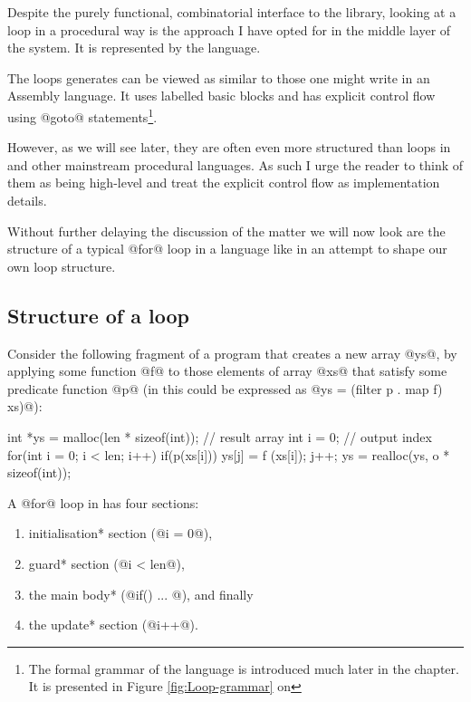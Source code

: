 \documentclass[preamble.tex]{subfiles}
\begin{document}
Despite the purely functional, combinatorial interface to the library, looking at a loop in a procedural way is the approach I have opted for in the middle layer of the system. It is represented by the \Loop language\iloop{}.

The loops \LiveFusion generates can be viewed as similar to those one might write in an Assembly language. It uses labelled basic blocks and has explicit control flow using @goto@ statements\footnote{The formal grammar of the \Loop language is introduced much later in the chapter. It is presented in Figure \ref{fig:Loop-grammar} on \pageref{fig:Loop-grammar}}.

However, as we will see later, they are often even more structured than loops in \C and other mainstream procedural languages. As such I urge the reader to think of them as being high-level and treat the explicit control flow as implementation details.


Without further delaying the discussion of the matter we will now look are the structure of a typical @for@ loop in a language like \C in an attempt to shape our own loop structure.


\subsection{Structure of a  loop}

Consider the following fragment of a \C program that creates a new array @ys@, by applying some function @f@ to those elements of array @xs@ that satisfy some predicate function @p@ (in \Haskell this could be expressed as @ys = (filter p . map f) xs)@):

\begin{ccode}[numbers=left]
int *ys = malloc(len * sizeof(int)); // result array
int i = 0;                          // output index
for(int i = 0; i < len; i++) {
    if(p(xs[i])) {
        ys[j] = f (xs[i]);
        j++;
    }
}
ys = realloc(ys, o * sizeof(int));
\end{ccode}

A @for@ loop in \C has four sections:

\begin{enumerate}
\halfspacing
\item \*initialisation* section (@i = 0@),
\item \*guard* section (@i < len@),
\item the main \*body* (@if(){ $...$ }@), and finally
\item the \*update* section (@i++@).
\end{enumerate}
\end{document}
